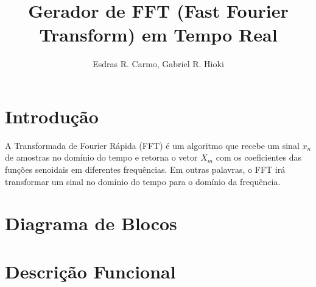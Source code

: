 \documentclass{article}
\begin{document}
\title{Gerador de FFT (Fast Fourier Transform) em Tempo Real}
\author{Esdras R. Carmo, Gabriel R. Hioki}

\maketitle
\newpage
\tableofcontents
\newpage

\section{Introdução}
A Transformada de Fourier Rápida (FFT) é um algoritmo que recebe um sinal
$x_n$ de amostras no domínio do tempo e retorna o vetor $X_m$ com os coeficientes
das funções senoidais em diferentes frequências. Em outras palavras, o FFT irá 
transformar um sinal no domínio do tempo para o domínio da frequência.



\section{Diagrama de Blocos}

\section{Descrição Funcional}
\end{document}
